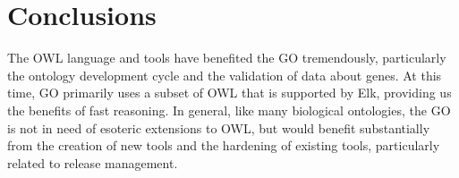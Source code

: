 \documentclass{llncs}
\begin{document}
\section{Conclusions}

The OWL language and tools have benefited the GO tremendously,
particularly the ontology development cycle and the validation of data
about genes. At this time, GO primarily uses a subset of OWL that is
supported by Elk, providing us the benefits of fast reasoning. In
general, like many biological ontologies, the GO is not in need of
esoteric extensions to OWL, but would benefit substantially from the
creation of new tools and the hardening of existing tools,
particularly related to release management.









\end{document}
